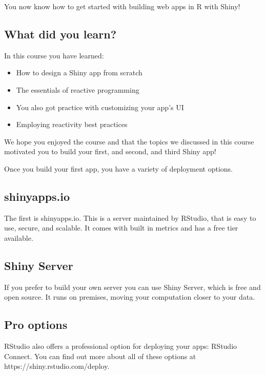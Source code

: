 \documentclass[
  letterpaper,
  DIV=11,
  numbers=noendperiod]{scrreprt}
\providecommand{\tightlist}{%
  \setlength{\itemsep}{0pt}\setlength{\parskip}{0pt}}
\begin{document}
You now know how to get started with building web apps in R with Shiny!

\hypertarget{what-did-you-learn}{%
\subsection{What did you learn?}\label{what-did-you-learn}}

In this course you have learned:

\begin{itemize}
\tightlist
\item
  How to design a Shiny app from scratch
\item
  The essentials of reactive programming
\item
  You also got practice with customizing your app's UI
\item
  Employing reactivity best practices
\end{itemize}

We hope you enjoyed the course and that the topics we discussed in this
course motivated you to build your first, and second, and third Shiny
app!

Once you build your first app, you have a variety of deployment options.

\hypertarget{shinyapps.io}{%
\subsection{shinyapps.io}\label{shinyapps.io}}

The first is shinyapps.io. This is a server maintained by RStudio, that
is easy to use, secure, and scalable. It comes with built in metrics and
has a free tier available.

\hypertarget{shiny-server}{%
\subsection{Shiny Server}\label{shiny-server}}

If you prefer to build your own server you can use Shiny Server, which
is free and open source. It runs on premises, moving your computation
closer to your data.

\hypertarget{pro-options}{%
\subsection{Pro options}\label{pro-options}}

RStudio also offers a professional option for deploying your apps:
RStudio Connect. You can find out more about all of these options at
https://shiny.rstudio.com/deploy.
\end{document}
